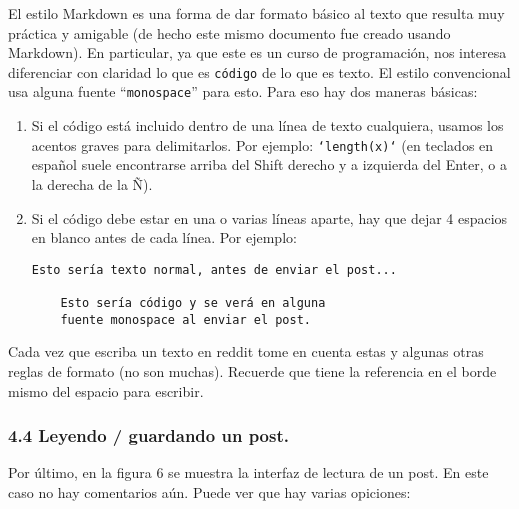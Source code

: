\documentclass[]{article}
\begin{document}
El estilo Markdown es una forma de dar formato básico al texto que
resulta muy práctica y amigable (de hecho este mismo documento fue
creado usando Markdown). En particular, ya que este es un curso de
programación, nos interesa diferenciar con claridad lo que es
\texttt{código} de lo que es texto. El estilo convencional usa alguna
fuente ``\texttt{monospace}'' para esto. Para eso hay dos maneras
básicas:

\begin{enumerate}[1.]
\item
  Si el código está incluido dentro de una línea de texto cualquiera,
  usamos los acentos graves para delimitarlos. Por ejemplo:
  \texttt{`length(x)`} (en teclados en español suele encontrarse arriba
  del Shift derecho y a izquierda del Enter, o a la derecha de la Ñ).
\item
  Si el código debe estar en una o varias líneas aparte, hay que dejar 4
  espacios en blanco antes de cada línea. Por ejemplo:

\begin{verbatim}
Esto sería texto normal, antes de enviar el post...

    Esto sería código y se verá en alguna
    fuente monospace al enviar el post.
\end{verbatim}
\end{enumerate}
Cada vez que escriba un texto en reddit tome en cuenta estas y algunas
otras reglas de formato (no son muchas). Recuerde que tiene la
referencia en el borde mismo del espacio para escribir.

\subsubsection{4.4 Leyendo / guardando un post.}

Por último, en la figura 6 se muestra la interfaz de lectura de un post.
En este caso no hay comentarios aún. Puede ver que hay varias opiciones:
\end{document}
